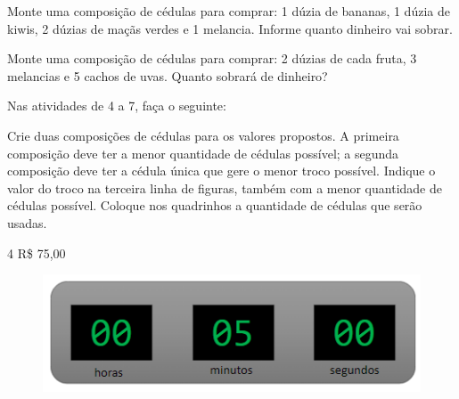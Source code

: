 \begin{escolha}
\item Monte uma composição de cédulas para comprar: 1 dúzia de bananas, 1 dúzia de kiwis, 2 dúzias de maçãs verdes e 1 melancia. Informe quanto dinheiro vai sobrar.

\reduline{\mbox{}\hfill}
\reduline{\mbox{}\hfill}
\reduline{\mbox{}\hfill}

\item Monte uma composição de cédulas para comprar: 2 dúzias de cada fruta, 3 melancias e 5 cachos de uvas. Quanto sobrará de dinheiro?

\reduline{\mbox{}\hfill}
\reduline{\mbox{}\hfill}
\reduline{\mbox{}\hfill}
\end{escolha}

Nas atividades de 4 a 7, faça o seguinte:

Crie duas composições de cédulas para os valores propostos. A primeira composição deve ter a menor quantidade de cédulas possível; a segunda composição deve ter a cédula única que gere o menor troco possível. Indique o valor do troco na terceira linha de figuras, também com a menor quantidade de cédulas possível. Coloque nos quadrinhos a quantidade de cédulas que serão usadas.


\pagebreak

\num{4} R\$ 75,00

\begin{figure}[htpb!]
\includegraphics[width=.9\textwidth]{./media/image67.png}
\end{figure}

